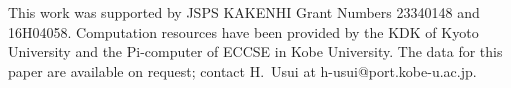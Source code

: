 \documentclass[draft,jgrga]{agutex2015}
\begin{document}
\begin{article}
%
%
%
%
%
%
%

\begin{acknowledgments}
This work was supported by JSPS KAKENHI Grant Numbers 23340148 and 16H04058. 
Computation resources have been provided by the KDK of Kyoto University
and the Pi-computer  of ECCSE in Kobe University.
The data for this paper are available on request; 
contact H.~Usui at h-usui@port.kobe-u.ac.jp.
\end{acknowledgments}

%
%
%
%
%
%
%
%
%


\end{article}
\end{document}
